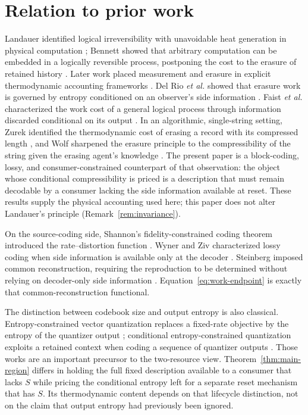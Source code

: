 \documentclass[letterpaper,onecolumn]{IEEEtran}
\theoremstyle{definition}
\theoremstyle{remark}
\newcommand{\1}{\mathbf{1}}
\begin{document}
\section{Relation to prior work}\label{sec:prior}

Landauer identified logical irreversibility with unavoidable heat generation
in physical computation \cite{landauer1961}; Bennett showed that arbitrary
computation can be embedded in a logically reversible process, postponing the
cost to the erasure of retained history \cite{bennett1973}. Later work placed
measurement and erasure in explicit thermodynamic accounting frameworks
\cite{sagawa2009,parrondo2015}. Del Rio \emph{et al.} showed that erasure work
is governed by entropy conditioned on an observer's side information
\cite{delrio2011}. Faist \emph{et al.} characterized the work cost of a general
logical process through information discarded conditional on its output
\cite{faist2015}. In an algorithmic, single-string setting, Zurek identified
the thermodynamic cost of erasing a record with its compressed length
\cite{zurek1989}, and Wolf sharpened the erasure principle to the
compressibility of the string given the erasing agent's knowledge
\cite{wolf2018}. The present paper is a block-coding, lossy, and
consumer-constrained counterpart of that observation: the object whose
conditional compressibility is priced is a description that must remain
decodable by a consumer lacking the side information available at reset.
These results supply the physical accounting used here; this paper does not
alter Landauer's principle (Remark~\ref{rem:invariance}).

On the source-coding side, Shannon's fidelity-constrained coding theorem
introduced the rate--distortion function \cite{shannon1959}. Wyner and Ziv
characterized lossy coding when side information is available only at the
decoder \cite{wynerziv1976}. Steinberg imposed common reconstruction, requiring
the reproduction to be determined without relying on decoder-only side
information \cite{steinberg2009}. Equation~\eqref{eq:work-endpoint} is exactly
that common-reconstruction functional.

The distinction between codebook size and output entropy is also classical.
Entropy-constrained vector quantization replaces a fixed-rate objective by the
entropy of the quantizer output \cite{chou1989}; conditional
entropy-constrained quantization exploits a retained context when coding a
sequence of quantizer outputs \cite{chou1990}. Those works are an important
precursor to the two-resource view. Theorem~\ref{thm:main-region} differs in
holding the full fixed description available to a consumer that lacks $S$ while
pricing the conditional entropy left for a separate reset mechanism that has
$S$. Its thermodynamic content depends on that lifecycle distinction, not on the
claim that output entropy had previously been ignored.
\end{document}
